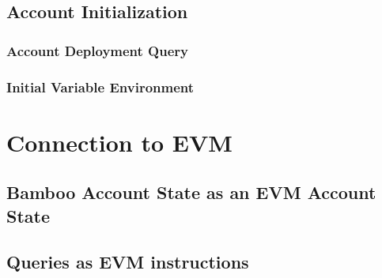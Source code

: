 \documentclass{book}
\begin{document}
\section{Account Initialization}

\subsection{Account Deployment Query}

\subsection{Initial Variable Environment}

\chapter{Connection to EVM}

\section{Bamboo Account State as an EVM Account State}

\section{Queries as EVM instructions}
\end{document}
